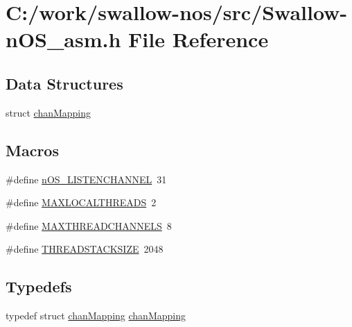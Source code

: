 \hypertarget{_swallow-n_o_s__asm_8h}{}\section{C\+:/work/swallow-\/nos/src/\+Swallow-\/n\+O\+S\+\_\+asm.h File Reference}
\label{_swallow-n_o_s__asm_8h}
\subsection*{Data Structures}
\begin{DoxyCompactItemize}
\item 
struct \hyperlink{structchan_mapping}{chan\+Mapping}
\end{DoxyCompactItemize}
\subsection*{Macros}
\begin{DoxyCompactItemize}
\item 
\#define \hyperlink{_swallow-n_o_s__asm_8h_a018a8bb6f96a0f0cb8fbf22a16583b4f}{n\+O\+S\+\_\+\+L\+I\+S\+T\+E\+N\+C\+H\+A\+N\+N\+E\+L}~31
\item 
\#define \hyperlink{_swallow-n_o_s__asm_8h_a8cb31be9c44f9353186d8189adc6ab61}{M\+A\+X\+L\+O\+C\+A\+L\+T\+H\+R\+E\+A\+D\+S}~2
\item 
\#define \hyperlink{_swallow-n_o_s__asm_8h_aff3d0aba3f75b128f9002ba839271db8}{M\+A\+X\+T\+H\+R\+E\+A\+D\+C\+H\+A\+N\+N\+E\+L\+S}~8
\item 
\#define \hyperlink{_swallow-n_o_s__asm_8h_a21e454ec7311762ec0390b5c771791c1}{T\+H\+R\+E\+A\+D\+S\+T\+A\+C\+K\+S\+I\+Z\+E}~2048
\end{DoxyCompactItemize}
\subsection*{Typedefs}
\begin{DoxyCompactItemize}
\item 
typedef struct \hyperlink{structchan_mapping}{chan\+Mapping} \hyperlink{_swallow-n_o_s__asm_8h_acfda9b7ba12713ce46649ec7550afec8}{chan\+Mapping}
\end{DoxyCompactItemize}
